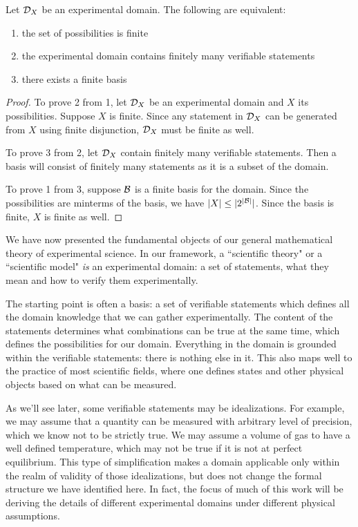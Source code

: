 	\begin{mathSection}
		\begin{prop}
			Let $\mathcal{D}_X$ be an experimental domain. The following are equivalent:
			\begin{enumerate}
				\item the set of possibilities is finite
				\item the experimental domain contains finitely many verifiable statements
				\item there exists a finite basis
			\end{enumerate}
		\end{prop}
		\begin{proof}
			To prove 2 from 1, let $\mathcal{D}_X$ be an experimental domain and $X$ its possibilities. Suppose $X$ is finite. Since any statement in $\mathcal{D}_X$ can be generated from $X$ using finite disjunction, $\mathcal{D}_X$ must be finite as well.
			
			To prove 3 from 2, let $\mathcal{D}_X$ contain finitely many verifiable statements. Then a basis will consist of finitely many statements as it is a subset of the domain.
			
			To prove 1 from 3, suppose $\mathcal{B}$ is a finite basis for the domain. Since the possibilities are minterms of the basis, we have $|X| \leq |2^{|\mathcal{B}|}|$. Since the basis is finite, $X$ is finite as well.
		\end{proof}
	\end{mathSection}
	
	We have now presented the fundamental objects of our general mathematical theory of experimental science. In our framework, a ``scientific theory" or a ``scientific model" \emph{is} an experimental domain: a set of statements, what they mean and how to verify them experimentally.
	
	The starting point is often a basis: a set of verifiable statements which defines all the domain knowledge that we can gather experimentally. The content of the statements determines what combinations can be true at the same time, which defines the possibilities for our domain. Everything in the domain is grounded within the verifiable statements: there is nothing else in it. This also maps well to the practice of most scientific fields, where one defines states and other physical objects based on what can be measured.
	
	As we'll see later, some verifiable statements may be idealizations. For example, we may assume that a quantity can be measured with arbitrary level of precision, which we know not to be strictly true. We may assume a volume of gas to have a well defined temperature, which may not be true if it is not at perfect equilibrium. This type of simplification makes a domain applicable only within the realm of validity of those idealizations, but does not change the formal structure we have identified here. In fact, the focus of much of this work will be deriving the details of different experimental domains under different physical assumptions.
	

